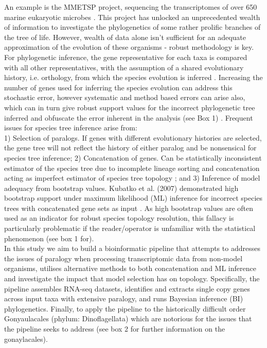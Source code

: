\documentclass[12pt]{article}
\begin{document}
An example is the MMETSP project, sequencing the transcriptomes of over 650 marine eukaryotic microbes \cite{keeling2014marine}. 
This project has unlocked an unprecedented wealth of information to investigate the phylogenetics of some rather prolific branches of the tree of life. 
However, wealth of data alone isn't sufficient for an adequate approximation of the evolution of these organisms - robust methodology is key. 
For phylogenetic inference, the gene representative for each taxa is compared with all other representatives, with the assumption of a shared evolutionary history, i.e. orthology, from which the species evolution is inferred \cite{maddison1997gene}. 
Increasing the number of genes used for inferring the species evolution can address this stochastic error, however systematic and method based errors can arise also, which can in turn give robust support values for the incorrect phylogenetic tree inferred and obfuscate the error inherent in the analysis (see Box 1) \cite{jeffroy2006phylogenomics,roch2015likelihood,kubatko2007inconsistency}. 
Frequent issues for species tree inference arise from:\\
1) Selection of paralogs. If genes with different evolutionary histories are selected, the gene tree will not reflect the history of either paralog and be nonsensical for species tree inference; 
2) Concatenation of genes. Can be statistically inconsistent estimator of the species tree due to incomplete lineage sorting and concatenation acting as imperfect estimator of species tree topology \cite{roch2015likelihood}; and 
3) Inference of model adequacy from bootstrap values. Kubatko et al. (2007) demonstrated high bootstrap support under maximum likelihood (ML) inference for incorrect species trees with concatenated gene sets as input \cite{kubatko2007inconsistency}. 
As high bootstrap values are often used as an indicator for robust species topology resolution, this fallacy is particularly problematic if the reader/operator is unfamiliar with the statistical phenomenon (see box 1 for).\\
In this study we aim to build a bioinformatic pipeline that attempts to addresses the issues of paralogy when processing transcriptomic data from non-model organisms, utilises alternative methods to both concatenation and ML inference and investigate the impact that model selection has on topology. 
Specifically, the pipeline assembles RNA-seq datasets, identifies and extracts single copy genes across input taxa with extensive paralogy, and runs Bayesian inference (BI) phylogenetics. 
Finally, to apply the pipeline to the historically difficult order Gonyaulacales (phylum: Dinoflagellata) which are notorious for the issues that the pipeline seeks to address (see box 2 for further information on the gonaylacales).\\
\end{document}
